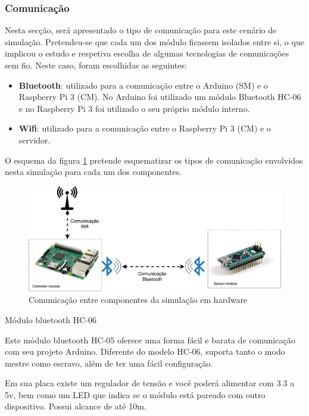 \subsubsection{Comunicação}

Nesta secção, será apresentado o tipo de comunicação para este cenário de simulação. Pretendeu-se que cada um dos módulo ficassem isolados entre si, o que implicou o estudo e respetiva escolha de algumas tecnologias de comunicações sem fio. Neste caso, foram escolhidas as seguintes: 

\begin{itemize}
	\item \textbf{Bluetooth}: utilizado para a comunicação entre o Arduino (\ac{SM}) e o Raspberry Pi 3 (\ac{CM}). No Arduino foi utilizado um módulo Bluetooth HC-06 e no Raspberry Pi 3 foi utilizado o seu próprio módulo interno. 
	\item \textbf{Wifi}: utilizado para a comunicação entre o Raspberry Pi 3 (\ac{CM}) e o servidor. 
\end{itemize}


O esquema da figura \ref{esquemcomm} pretende esquematizar os tipos de comunicação envolvidos nesta simulação para cada um dos componentes. 

\begin{figure}[!htb]
	\centering
	\includegraphics[width=\linewidth]{img/comm-blue/HW-geral.pdf}
	\caption{Comunicação entre componentes da simulação em hardware}
	\label{esquemcomm}
\end{figure}




Módulo bluetooth HC-06



Este módulo bluetooth HC-05 oferece uma forma fácil e barata de comunicação com seu projeto Arduino. Diferente do modelo HC-06, suporta tanto o modo mestre como escravo, além de ter uma fácil configuração.

Em sua placa existe um regulador de tensão e você poderá alimentar com 3.3 a 5v, bem como um LED que indica se o módulo está pareado com outro dispositivo. Possui alcance de até 10m.

